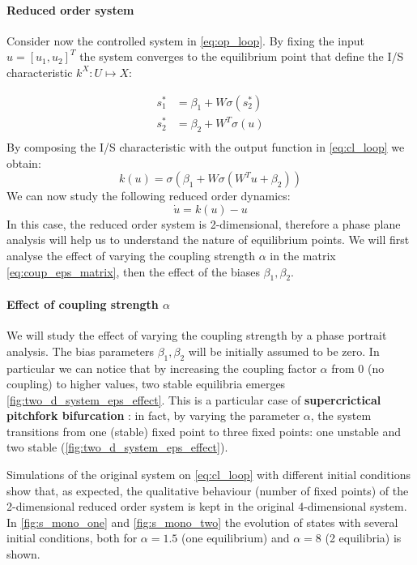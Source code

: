 \paragraph{Reduced order system} 
Consider now the controlled system in \eqref{eq:op_loop}. By fixing the input $u = [u_1, u_2]^T$ the system converges to the equilibrium point that define  the I/S characteristic $k^X: U \mapsto X$:

\begin{equation}
    \begin{aligned}
    s_1^* &=  \beta_1 + W\sigma(s_2^*)\\
    s_2^* &=  \beta_2 + W^T\sigma(u)\\
    \end{aligned}
\end{equation}
By composing the I/S characteristic with the output function in \eqref{eq:cl_loop} we obtain:
\begin{equation}
    k(u) = \sigma(\beta_1 + W\sigma(W^Tu + \beta_2))
    \label{eq:reduced_2d}
\end{equation}
We can now study the following reduced order dynamics:
\begin{equation}
    \dot{u} = k(u) - u
    \label{eq:reduced_2d}
\end{equation}
In this case, the reduced order system is 2-dimensional, therefore a phase plane analysis will help us to understand the nature of equilibrium points. We will first analyse the effect of varying the coupling strength $\alpha$ in the matrix \eqref{eq:coup_eps_matrix}, then the effect of the biases $\beta_1,\beta_2$.

\paragraph{Effect of coupling strength $\alpha$} We will study the effect of varying the coupling strength by a phase portrait analysis. The bias parameters $ \beta_1, \beta_2$ will be initially assumed to be zero. In particular we can notice that by increasing the coupling factor $ \alpha $ from 0 (no coupling) to higher values, two stable equilibria emerges \cref{fig:two_d_system_eps_effect}. This is a particular case of \textbf{supercrictical pitchfork bifurcation} \cite{StrogatzNonlinear}: in fact, by varying the parameter $\alpha$, the system transitions from one (stable) fixed point to three fixed points: one unstable and two stable (\cref{fig:two_d_system_eps_effect}). 

Simulations of the original system on \eqref{eq:cl_loop} with different initial conditions show that, as expected, the qualitative behaviour (number of fixed points) of the 2-dimensional reduced order system is kept in the original 4-dimensional system. In \cref{fig:s_mono_one} and \cref{fig:s_mono_two} the evolution of states with several initial conditions, both for $\alpha=1.5$ (one equilibrium) and $\alpha=8$ (2 equilibria) is shown.

